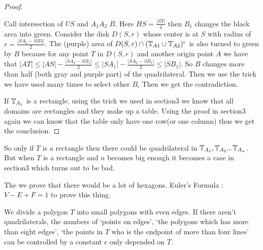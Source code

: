 \begin{proof}
\begin{center}
	\end{center}
	
	Call intersection of $US$ and $A_1A_2$ $B$. Here $HS = \frac{|ST|}{4}$ 
	then $B_1$ changes the black area into green. Consider the disk $D(S,r)$ 
	whose center is at $S$ with radius of $r = \frac{|SA_2-SB1|}{2}$. 
	The (purple) area of $D(S,r) \cap (\mathbb{T}_{A1} \cup \mathbb{T}_{A2})^c$ 
	is also turned to green by $B$ because for any point $T$ in $D(S,r)$ and
	another origin point $A$ we have that $|AT|\leq
	|AS|-\frac{|SA_2 - SB_1|}{2} \leq |SA_1| - \frac{|SA_2 - SB_1|}{2} 
	\leq |SB_1|$. So $B$ changes more than half (both gray and purple 
	part) of the quadrilateral. Then we use the trick we have used many 
	times to select other $B_i$ Then we get the contradiction.
	
	If $\mathbb{T}_{A_1}$ is a rectangle, using the trick we used in section3 
	we know that all domains are rectangles and they make up a table. 
	Using the proof in section3 again we can know that the table only 
	have one row(or one column) thus we get the conclusion.
\end{proof}

So only if $T$ is a rectangle then there could be quadrilateral 
in $\mathbb{T}_{A_1}, \mathbb{T}_{A_2} ... \mathbb{T}_{A_n}$. But when $T$ is a rectangle 
and $n$ becomes big enough it becomes a case in section3 which turns 
out to be bad. 

The we prove that there would be a lot of hexagons. Euler's Formula 
: $V-E+F=1$ to prove this thing.

\begin{thm}
	We divide a polygon $T$ into small polygons with even edges. 
	If there aren't quadrilaterals, the numbers of `points on edges', 
	`the polygons which has more than eight edges', `the points in $T$ 
	who is the endpoint of more than four lines' can be controlled 
	by a constant $c$ only depended on $T$.
\end{thm}

